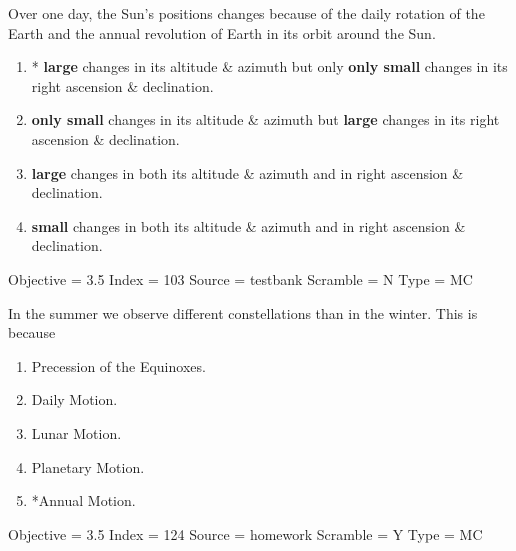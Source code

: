 \documentclass[11pt]{article}
\begin{document}
\begin{enumerate}
\begin{minipage}{\textwidth}
\begin{minipage}{\textwidth}
\item Over one day, the Sun's positions changes because of the daily rotation of the Earth and the annual revolution of Earth in its orbit around the Sun.
\begin{enumerate} 
\setlength{\itemsep}{1pt} 
\setlength{\parskip}{0pt} 
\setlength{\parsep}{0pt}
\setlength{\multicolsep}{1pt} 
\item * {\bf large} changes in its altitude \& azimuth but only {\bf only small} changes in its right ascension \& declination.
\item  {\bf only small} changes in  its altitude \& azimuth but {\bf large} changes in its right ascension \& declination.
\item  {\bf large} changes in both its altitude \& azimuth and in right ascension \& declination.
\item {\bf small} changes in both  its altitude \& azimuth and in right ascension \& declination.
\end{enumerate} 
Objective = 3.5
Index = 103
Source = testbank
Scramble = N
Type = MC
\end{minipage}
\end{minipage}
\vskip 0.20in

\begin{minipage}{\textwidth}
\begin{minipage}{\textwidth}
\item In the summer we observe different constellations than in the winter. This is because \underline{\hspace{0.5in}}
\begin{multicols}{2}
\begin{enumerate} 
\setlength{\itemsep}{1pt} 
\setlength{\parskip}{0pt} 
\setlength{\parsep}{0pt}
\setlength{\multicolsep}{1pt} 
\item Precession of the Equinoxes.
\item Daily Motion.
\item Lunar Motion.
\item Planetary Motion.
\item *Annual Motion.
\end{enumerate} 
\vfill 
\end{multicols}

Objective = 3.5
Index = 124
Source = homework
Scramble = Y
Type = MC
\end{minipage}
\end{minipage}
\vskip 0.20in


\end{enumerate}
\end{document}
